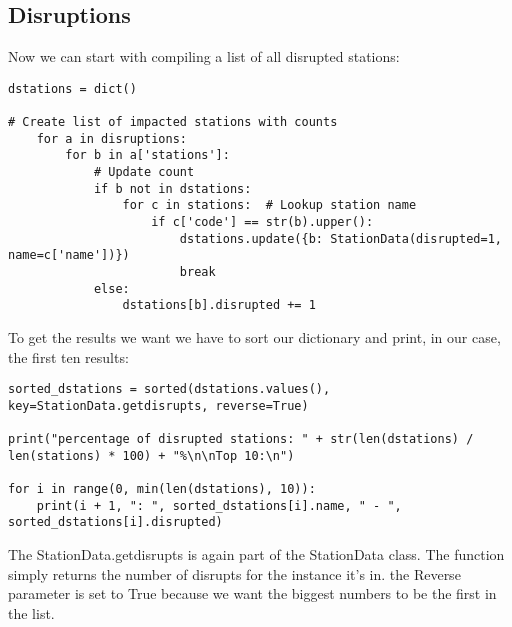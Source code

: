 \documentclass[a4paper, 12pt, one column]{article}
\begin{document}
\subsection{Disruptions}
Now we can start with compiling a list of all disrupted stations:
\begin{lstlisting}
dstations = dict()

# Create list of impacted stations with counts
	for a in disruptions:
		for b in a['stations']:
			# Update count
			if b not in dstations:
				for c in stations:  # Lookup station name
					if c['code'] == str(b).upper():
						dstations.update({b: StationData(disrupted=1, name=c['name'])})
						break
			else:
				dstations[b].disrupted += 1
\end{lstlisting}
To get the results we want we have to sort our dictionary and print, in our case, the first ten results:
\begin{lstlisting}
sorted_dstations = sorted(dstations.values(), key=StationData.getdisrupts, reverse=True)

print("percentage of disrupted stations: " + str(len(dstations) / len(stations) * 100) + "%\n\nTop 10:\n")

for i in range(0, min(len(dstations), 10)):
	print(i + 1, ": ", sorted_dstations[i].name, " - ", sorted_dstations[i].disrupted)
\end{lstlisting}
The StationData.getdisrupts is again part of the StationData class. The function simply returns the number of disrupts for the instance it's in. the Reverse parameter is set to True because we want the biggest numbers to be the first in the list.

\newpage
\end{document}
